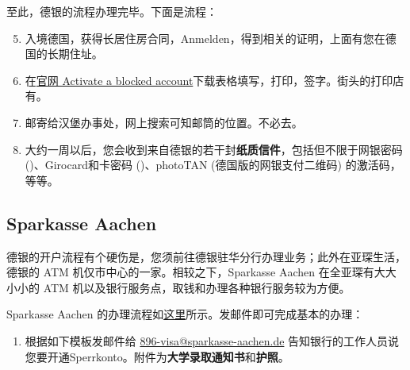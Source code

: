     至此，德银的流程办理完毕。下面是流程：

    \begin{enumerate}
      \setcounter{enumi}{4}
      \item 入境德国，获得长居住房合同，Anmelden，得到相关的证明，上面有您在德国的长期住址。
      \item 在\href{https://www.deutsche-bank.de/pk/konto-und-karte/konten-im-ueberblick/internationale-studenten1.html#parsys-tabs_copy_1250445051-tabsParsys-tabpanel_1536556080-tabPanelParsys-accordion-accordionParsys-accordionentry_317017862}{官网\MVRightarrow{} Activate a blocked account}下载表格填写，打印，签字。街头的打印店有。
      \item 邮寄给汉堡办事处，网上搜索可知邮筒的位置。不必去。
      \item 大约一周以后，您会收到来自德银的若干封\textbf{纸质信件}，包括但不限于网银密码 ()、Girocard和卡密码 ()、photoTAN (德国版的网银支付二维码) 的激活码，等等。
    \end{enumerate}

  \subsection{Sparkasse Aachen}\label{subsec:Sparkasse Aachen}

    德银的开户流程有个硬伤是，您须前往德银驻华分行办理业务；此外在亚琛生活，德银的 ATM 机仅市中心的一家。相较之下，Sparkasse Aachen 在全亚琛有大大小小的 ATM 机以及银行服务点，取钱和办理各种银行服务较为方便。

    Sparkasse Aachen 的办理流程如\href{https://www.sparkasse.de/pk/ratgeber/bildung/studium/sperrkonto.html}{这里}所示。发邮件即可完成基本的办理：

    \begin{enumerate}
      \item 根据如下模板发邮件给 \href{mailto:896-visa@sparkasse-aachen.de}{896-visa@sparkasse-aachen.de} 告知银行的工作人员说您要开通Sperrkonto。附件为\textbf{大学录取通知书}和\textbf{护照}。
    \end{enumerate}


